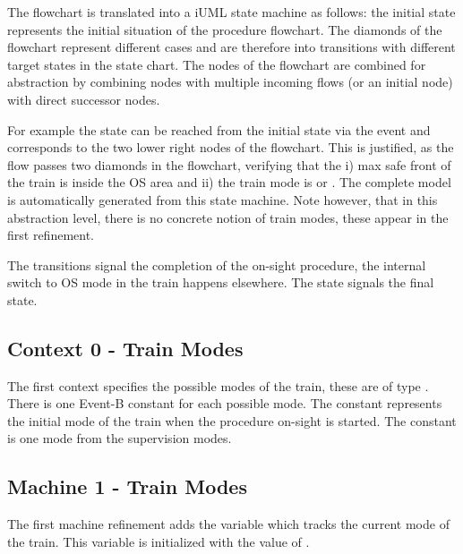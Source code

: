 \documentclass{template/openetcs_article}
\begin{document}
The flowchart is translated into a iUML state machine as follows: the initial
state represents the initial situation of the procedure flowchart. The diamonds
of the flowchart represent different cases and are therefore into transitions
with different target states in the state chart. The nodes of the flowchart are
combined for abstraction by combining nodes with multiple incoming flows (or an
initial node) with direct successor nodes.

For example the state  can be reached from the
initial state via the event
 and corresponds to the two
lower right nodes of the flowchart. This is justified, as the flow passes two
diamonds in the flowchart, verifying that the i) max safe front of the train is
inside the OS area and ii) the train mode is  or . The
complete model is automatically generated from this state machine. Note
however, that in this abstraction level, there is no concrete notion of train
modes, these appear in the first refinement.

The transitions  signal the completion of the
on-sight procedure, the internal switch to OS mode in the train happens
elsewhere. The state  signals the final state.

\subsection{Context 0 - Train Modes}
\label{sec:context-0-entities}

The first context  specifies the possible modes of the train, these are
of type . There is one Event-B constant for each possible
mode. The constant  represents the initial mode of the
train when the procedure on-sight is started. The constant
 is one mode from the supervision modes.

{\footnotesize

}

\subsection{Machine 1 - Train Modes}
\label{sec:machine-1-train}

The first machine refinement adds the variable  which tracks
the current mode of the train. This variable is initialized with the value of
.
\end{document}
